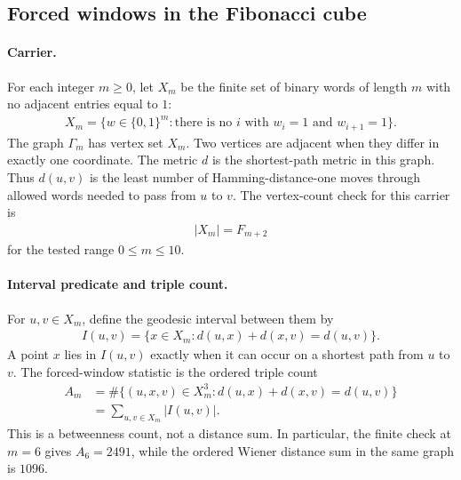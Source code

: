 \subsection{Forced windows in the Fibonacci cube}
\label{sec:window-fibonacci-cube-betweenness-triple}

\paragraph{Carrier.}
For each integer $m \geq 0$, let $X_m$ be the finite set of binary words of length $m$ with no adjacent entries equal to $1$:
$$
\begin{aligned}
X_m=\{w \in \{0,1\}^m : \text{there is no } i \text{ with } w_i=1 \text{ and } w_{i+1}=1\}.
\end{aligned}
$$
The graph $\Gamma_m$ has vertex set $X_m$. Two vertices are adjacent when they differ in exactly one coordinate. The metric $d$ is the shortest-path metric in this graph. Thus $d(u,v)$ is the least number of Hamming-distance-one moves through allowed words needed to pass from $u$ to $v$. The vertex-count check for this carrier is
$$
\begin{aligned}
|X_m|=F_{m+2}
\end{aligned}
$$
for the tested range $0 \leq m \leq 10$.

\paragraph{Interval predicate and triple count.}
For $u,v \in X_m$, define the geodesic interval between them by
$$
\begin{aligned}
I(u,v)=\{x \in X_m : d(u,x)+d(x,v)=d(u,v)\}.
\end{aligned}
$$
A point $x$ lies in $I(u,v)$ exactly when it can occur on a shortest path from $u$ to $v$. The forced-window statistic is the ordered triple count
$$
\begin{aligned}
A_m
&=\#\{(u,x,v) \in X_m^3 : d(u,x)+d(x,v)=d(u,v)\} \\
&=\sum_{u,v \in X_m}|I(u,v)|.
\end{aligned}
$$
This is a betweenness count, not a distance sum. In particular, the finite check at $m=6$ gives $A_6=2491$, while the ordered Wiener distance sum in the same graph is $1096$.

